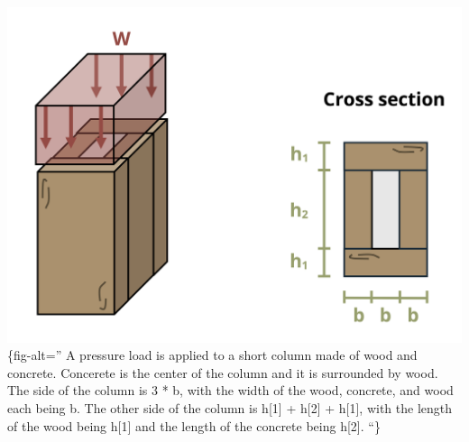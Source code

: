 \documentclass[
  letterpaper,
  DIV=11,
  numbers=noendperiod]{scrreprt}
\begin{document}
\includegraphics{images/248.png}\{fig-alt='' A pressure load is applied
to a short column made of wood and concrete. Concerete is the center of
the column and it is surrounded by wood. The side of the column is 3 *
b, with the width of the wood, concrete, and wood each being b. The
other side of the column is h{[}1{]} + h{[}2{]} + h{[}1{]}, with the
length of the wood being h{[}1{]} and the length of the concrete being
h{[}2{]}. ``\}
\end{document}
